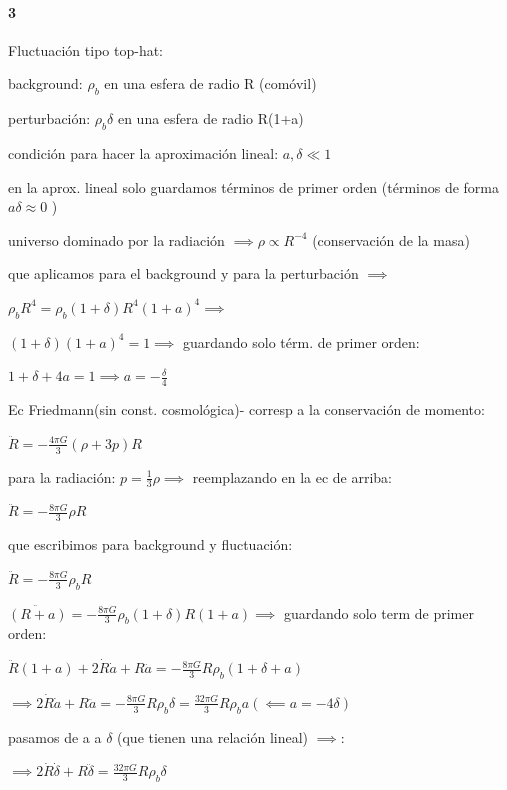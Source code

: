 \documentclass[12pt]{book}
\begin{document}
\paragraph{3}


Fluctuación tipo top-hat:
\begin{description}
\item background: $\rho_b$ en una esfera de radio R (comóvil)
\item perturbación: $\rho_b \delta $ en una esfera de radio R(1+a)
\item condición para  hacer la aproximación lineal: $ a, \delta \ll 1$
\end{description}

en la aprox. lineal solo guardamos  términos de primer orden (términos de forma $a \delta \approx 0$ )

universo dominado por la radiación $\implies \rho \propto R^{-4}$ (conservación de la masa)

que aplicamos para el background y para la perturbación $\implies $

$\rho_b R^4 = \rho_b (1+\delta) R^4 (1+a)^4 \implies $

$(1+\delta)(1+a)^4 = 1 \implies $ guardando solo térm. de primer orden: 


$1 + \delta + 4a = 1 \implies a = -\frac{\delta}{4}$

Ec Friedmann(sin const. cosmológica)- corresp a la conservación de momento:

$\ddot{R} = -\frac{4 \pi G}{3} (\rho + 3p) R$

para la radiación: $p = \frac{1}{3} \rho \implies$ reemplazando en la ec de arriba: 

$\ddot{R} = -\frac{8 \pi G}{3} \rho  R$

que escribimos para background y fluctuación:


$\ddot{R} = -\frac{8 \pi G}{3} \rho_b  R$

$\ddot{(R+a)} = -\frac{8 \pi G}{3} \rho_b(1+\delta)  R(1+a) \implies $ guardando solo term de primer orden:


$\ddot{R}(1+a) + 2 \dot{R}\dot{a} + R \ddot{a} =  -\frac{8 \pi G}{3} R  \rho_b(1+\delta + a) $


$\implies 2  \dot{R}\dot{a} + R \ddot{a} =  -\frac{8 \pi G}{3} R  \rho_b \delta = \frac{32 \pi G}{3} R  \rho_b a (\impliedby a = -4\delta)$

pasamos de a a $\delta$ (que tienen una relación lineal) $\implies $: 

$\implies 2  \dot{R}\dot{\delta} + R \ddot{\delta} =  \frac{32 \pi G}{3} R  \rho_b \delta $
\end{document}
